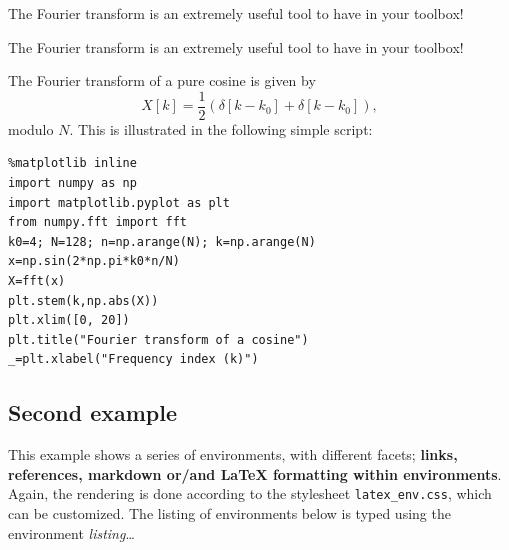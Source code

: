 \begin{listing}
\begin{textboxa}
The Fourier transform is an extremely useful tool to have in your toolbox!
\end{textboxa}
\end{listing}

    \begin{textboxa}
The Fourier transform is an extremely useful tool to have in your toolbox!
\end{textboxa}

    The Fourier transform of a pure cosine is given by \begin{equation}
X[k] = \frac{1}{2} \left( \delta[k-k_0] + \delta[k-k_0] \right), 
\end{equation} modulo $N$. This is illustrated in the following simple script:
\begin{lstlisting}
%matplotlib inline
import numpy as np
import matplotlib.pyplot as plt 
from numpy.fft import fft
k0=4; N=128; n=np.arange(N); k=np.arange(N)
x=np.sin(2*np.pi*k0*n/N)
X=fft(x)
plt.stem(k,np.abs(X))
plt.xlim([0, 20])
plt.title("Fourier transform of a cosine")
_=plt.xlabel("Frequency index (k)")
\end{lstlisting}%
%
    \begin{center}
\end{center}
    
    \subsection{Second example}\label{second-example}

    This example shows a series of environments, with different facets;
\textbf{links, references, markdown or/and LaTeX formatting within
environments}. Again, the rendering is done according to the stylesheet
\texttt{latex\_env.css}, which can be customized. The listing of
environments below is typed using the environment \emph{listing}\ldots{}

